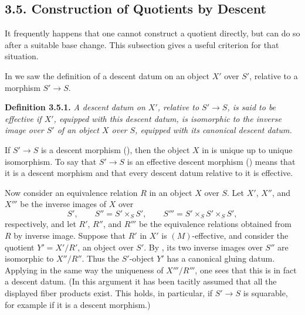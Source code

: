 \subsection*{3.5. Construction of Quotients by Descent}

It frequently happens that one cannot construct a quotient directly, but
can do so after a suitable base change. This subsection gives a useful
criterion for that situation.

In  we saw the definition of a descent datum on an object \(X'\) over
\(S'\), relative to a morphism \(S'\to S\).

\medskip
\noindent{}\textbf{Definition 3.5.1.}
\textit{A descent datum on \(X'\), relative to \(S'\to S\), is said to be
\emph{effective} if \(X'\), equipped with this descent datum, is isomorphic
to the inverse image over \(S'\) of an object \(X\) over \(S\), equipped
with its canonical descent datum.}

If \(S'\to S\) is a descent morphism (), then the object \(X\) in  is unique up to unique isomorphism. To say that \(S'\to S\) is
an effective descent morphism () means that it is a descent morphism and
that every descent datum relative to it is effective.

Now consider an equivalence relation \(R\) in an object \(X\) over \(S\).
Let \(X'\), \(X''\), and \(X'''\) be the inverse images of \(X\) over
\[
  S',\qquad S''=S'\times_SS',\qquad
  S'''=S'\times_SS'\times_SS',
\]
respectively, and let \(R'\), \(R''\), and \(R'''\) be the equivalence
relations obtained from \(R\) by inverse image. Suppose that \(R'\) in
\(X'\) is \((M)\)-effective, and consider the quotient
\(Y'=X'/R'\), an object over \(S'\). By , its two inverse images over
\(S''\) are isomorphic to \(X''/R''\). Thus the \(S'\)-object \(Y'\) has a
canonical gluing datum. Applying in the same way the uniqueness of
\(X'''/R'''\), one sees that this is in fact a descent datum. (In this
argument it has been tacitly assumed that all the displayed fiber products
exist. This holds, in particular, if \(S'\to S\) is squarable, for example
if it is a descent morphism.)

